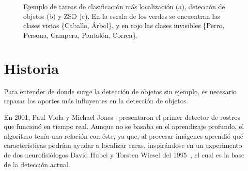 \begin{figure}[]
	\centering
	\caption{Ejemplo de tareas de clasificación más localización (a), detección de objetos (b) y ZSD (c). En la escala de los verdes se encuentran las clases vistas \{Caballo, Árbol\}, y en rojo las clases invisibles \{Perro, Persona, Campera, Pantalón, Correa\}.}
	\label{fig:DetectoresYSZD}
\end{figure}


\section{Historia} \label{sec:historia}

Para entender de donde surge la detección de objetos sin ejemplo, es necesario repasar los aportes más influyentes en la detección de objetos. 

En 2001, Paul Viola y Michael Jones~\cite{viola2001rapid} presentaron el primer detector de rostros que funcionó en tiempo real. Aunque no se basaba en el aprendizaje profundo, el algoritmo tenía una relación con éste, ya que, al procesar imágenes aprendió qué características podrían ayudar a localizar caras, inspirándose en un experimento de dos neurofisiólogos David Hubel y Torsten Wiesel del 1995~\cite{hubel1959receptive}, el cual es la base de la detección actual.

